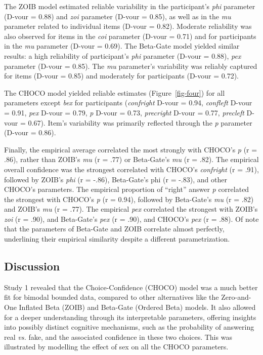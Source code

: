 \documentclass[
  jou,
  floatsintext,
  longtable,
  nolmodern,
  notxfonts,
  notimes,
  colorlinks=true,linkcolor=blue,citecolor=blue,urlcolor=blue]{apa7}
\begin{document}
The ZOIB model estimated reliable variability in the participant's
\emph{phi} parameter (D-vour = 0.88) and \emph{zoi} parameter (D-vour =
0.85), as well as in the \emph{mu} parameter related to individual items
(D-vour = 0.82). Moderate reliability was also observed for items in the
\emph{coi} parameter (D-vour = 0.71) and for participants in the
\emph{mu} parameter (D-vour = 0.69). The Beta-Gate model yielded similar
results: a high reliability of participant's \emph{phi} parameter
(D-vour = 0.88), \emph{pex} parameter (D-vour = 0.85). The \emph{mu}
parameter's variability was reliably captured for items (D-vour = 0.85)
and moderately for participants (D-vour = 0.72).

The CHOCO model yielded reliable estimates (Figure~\ref{fig-four}) for
all parameters except \emph{bex} for participants (\emph{confright}
D-vour = 0.94, \emph{confleft} D-vour = 0.91, \emph{pex} D-vour = 0.79,
\emph{p} D-vour = 0.73, \emph{precright} D-vour = 0.77, \emph{precleft}
D-vour = 0.67). Item's variability was primarily reflected through the
\emph{p} parameter (D-vour = 0.86).

Finally, the empirical average correlated the most strongly with CHOCO's
\emph{p} (r = .86), rather than ZOIB's \emph{mu} (r = .77) or
Beta-Gate's \emph{mu} (r = .82). The empirical overall confidence was
the strongest correlated with CHOCO's \emph{confright} (r = .91),
followed by ZOIB's \emph{phi} (r = -.86), Beta-Gate's phi (r = -.83),
and other CHOCO's parameters. The empirical proportion of ``right''
answer \emph{p} correlated the strongest with CHOCO's \emph{p} (r =
0.94), followed by Beta-Gate's \emph{mu} (r = .82) and ZOIB's \emph{mu}
(r = .77). The empirical \emph{pex} correlated the strongest with ZOIB's
\emph{zoi} (r = .90), and Beta-Gate's \emph{pex} (r = .90), and CHOCO's
\emph{pex} (r = .88). Of note that the parameters of Beta-Gate and ZOIB
correlate almost perfectly, underlining their empirical similarity
despite a different parametrization.

\subsection{Discussion}\label{discussion}

Study 1 revealed that the Choice-Confidence (CHOCO) model was a much
better fit for bimodal bounded data, compared to other alternatives like
the Zero-and-One Inflated Beta (ZOIB) and Beta-Gate (Ordered Beta)
models. It also allowed for a deeper understanding through its
interpretable parameters, offering insights into possibly distinct
cognitive mechanisms, such as the probability of answering real
\emph{vs.} fake, and the associated confidence in these two choices.
This was illustrated by modelling the effect of sex on all the CHOCO
parameters.
\end{document}

